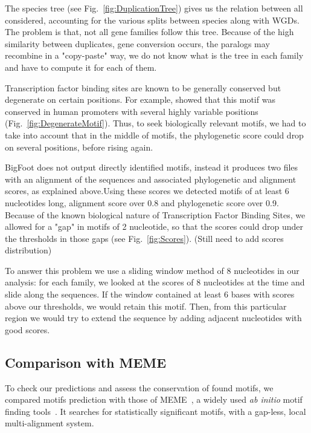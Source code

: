 The species tree (see Fig.~\ref{fig:DuplicationTree}) gives us the relation between all considered, accounting for the various splits between species along with WGDs. The problem is that, not all gene families follow this tree. Because of the high similarity between duplicates, gene conversion occurs, the paralogs may recombine in a "copy-paste" way, we do not know what is the tree in each family and have to compute it for each of them.

Transcription factor binding sites are known to be generally conserved but degenerate on certain positions. For example, \citealt{whitfield_functional_2012} showed that this motif was conserved in human promoters with several highly variable positions (Fig.~\ref{fig:DegenerateMotif}). Thus, to seek biologically relevant motifs, we had to take into account that in the middle of motifs, the phylogenetic score could drop on several positions, before rising again.

BigFoot does not output directly identified motifs, instead it produces two files with an alignment of the sequences and associated phylogenetic and alignment scores, as explained above.Using these scores we detected motifs of at least 6 nucleotides long, alignment score over 0.8 and phylogenetic score over 0.9. Because of the known biological nature of Transcription Factor Binding Sites, we allowed for a "gap" in motifs of 2 nucleotide, so that the scores could drop under the thresholds in those gaps (see Fig.~\ref{fig:Scores}). (Still need to add scores distribution)

To answer this problem we use a sliding window method of 8 nucleotides in our analysis: for each family, we looked at the scores of 8 nucleotides at the time and slide along the sequences. If the window contained at least 6 bases with scores above our thresholds, we would retain this motif. Then, from this particular region we would try to extend the sequence by adding adjacent nucleotides with good scores.

\subsection*{Comparison with MEME}

To check our predictions and assess the conservation of found motifs, we compared motifs prediction with those of MEME~\citep{bailey_meme:_2006}, a widely used \textit{ab initio} motif finding tools~\citep{dhaeseleer_how_2006}. It searches for statistically significant motifs, with a gap-less, local multi-alignment system.

